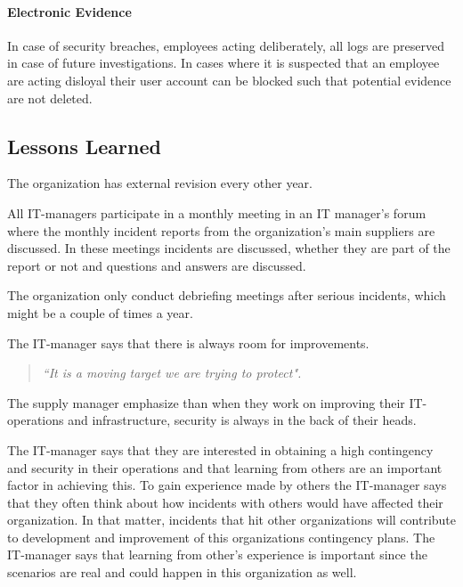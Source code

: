 \paragraph{Electronic Evidence}
In case of security breaches, employees acting deliberately, all logs are preserved in case of future investigations. In cases where it is suspected that an employee are acting disloyal their user account can be blocked such that potential evidence are not deleted.

\subsection{Lessons Learned}
The organization has external revision every other year.

All IT-managers participate in a monthly meeting in an IT manager's forum where the monthly incident reports from the organization's main suppliers are discussed. In these meetings incidents are discussed, whether they are part of the report or not and questions and answers are discussed.

The organization only conduct debriefing meetings after serious incidents, which might be a couple of times a year. 

The IT-manager says that there is always room for improvements. 
\begin{quote}
\textit{``It is a moving target we are trying to protect".}
\end{quote}

The supply manager emphasize than when they work on improving their IT-operations and infrastructure, security is always in the back of their heads.

The IT-manager says that they are interested in obtaining a high contingency and security in their operations and that learning from others are an important factor in achieving this. To gain experience made by others the IT-manager says that they often think about how incidents with others would have affected their organization. In that matter, incidents that hit other organizations will contribute to development and improvement of this organizations contingency plans. The IT-manager says that learning from other's experience is important since the scenarios are real and could happen in this organization as well.